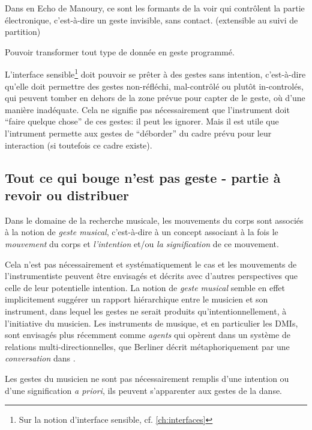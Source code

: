 Dans en Echo de Manoury, ce sont les formants de la voir qui contrôlent la partie électronique, c'est-à-dire un geste invisible, sans contact. (extensible au suivi de partition)


Pouvoir transformer tout type de donnée en geste programmé.


L'interface sensible\footnote{Sur la notion d'interface sensible, cf. \ref{ch:interfaces}} doit pouvoir se prêter à des gestes sans intention, c'est-à-dire qu'elle doit permettre des gestes non-réfléchi, mal-contrôlé ou plutôt in-controlés, qui peuvent tomber en dehors de la zone prévue pour capter de le geste, où d'une manière inadéquate. Cela ne signifie pas nécessairement que l'instrument doit ``faire quelque chose'' de ces gestes: il peut les ignorer.  Mais il est utile que l'intrument permette aux gestes de ``déborder'' du cadre prévu pour leur interaction (si toutefois ce cadre existe).


\subsection*{Tout ce qui bouge n'est pas geste - partie à revoir ou distribuer}

Dans le domaine de la recherche musicale, les mouvements du corps sont associés à la notion de \textit{geste musical}, c'est-à-dire à un concept associant à la fois le \textit{mouvement} du corps et \textit{l'intention} et/ou \textit{la signification} de ce mouvement. 

Cela n'est pas nécessairement et systématiquement le cas et les mouvements de l'instrumentiste peuvent être envisagés et décrits avec d'autres perspectives que celle de leur potentielle intention.  La notion de \textit{geste musical} semble en effet implicitement suggérer un rapport hiérarchique entre le musicien et son instrument, dans lequel les gestes ne serait produits qu'intentionnellement, à l'initiative du musicien. Les instruments de musique, et en particulier les DMIs, sont envisagés plus récemment comme \textit{agents} qui opèrent dans un système de relations multi-directionnelles, que Berliner décrit métaphoriquement par une \textit{conversation} dans \cite{berliner_thinking_2009}.  



Les gestes du musicien ne sont pas nécessairement remplis d'une intention ou d'une signification \textit{a priori}, ils peuvent s'apparenter aux gestes de la danse.




